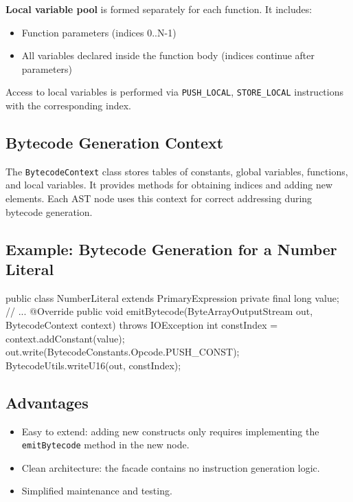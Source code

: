 \documentclass[a4paper,12pt]{article}
\begin{document}
    \textbf{Local variable pool} is formed separately for each function. It includes:
    \begin{itemize}
        \item Function parameters (indices 0..N-1)
        \item All variables declared inside the function body (indices continue after parameters)
    \end{itemize}
    Access to local variables is performed via \texttt{PUSH\_LOCAL}, \texttt{STORE\_LOCAL} instructions with the corresponding index.

    \subsection{Bytecode Generation Context}
    The \texttt{BytecodeContext} class stores tables of constants, global variables, functions, and local variables. It provides methods for obtaining indices and adding new elements. Each AST node uses this context for correct addressing during bytecode generation.

    \subsection{Example: Bytecode Generation for a Number Literal}
    \begin{snailcode}
        public class NumberLiteral extends PrimaryExpression {
  private final long value;
  // ...
  @Override
  public void emitBytecode(ByteArrayOutputStream out, BytecodeContext context) throws IOException {
  int constIndex = context.addConstant(value);
  out.write(BytecodeConstants.Opcode.PUSH_CONST);
  BytecodeUtils.writeU16(out, constIndex);
  }
  }
    \end{snailcode}


    \subsection{Advantages}
    \begin{itemize}
        \item Easy to extend: adding new constructs only requires implementing the \texttt{emitBytecode} method in the new node.
        \item Clean architecture: the facade contains no instruction generation logic.
        \item Simplified maintenance and testing.
    \end{itemize}
\end{document}
